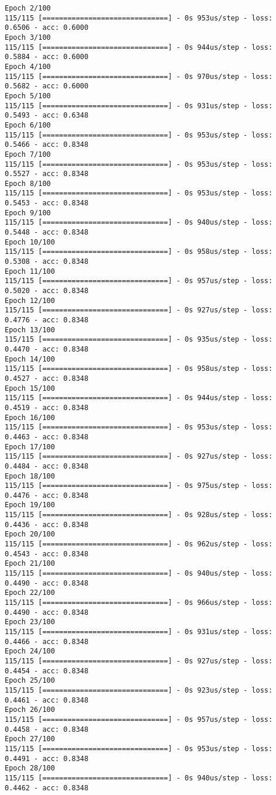 \documentclass[11pt]{article}
\begin{document}
\begin{Verbatim}[commandchars=\\\{\}]
Epoch 2/100
115/115 [==============================] - 0s 953us/step - loss: 0.6506 - acc: 0.6000
Epoch 3/100
115/115 [==============================] - 0s 944us/step - loss: 0.5884 - acc: 0.6000
Epoch 4/100
115/115 [==============================] - 0s 970us/step - loss: 0.5682 - acc: 0.6000
Epoch 5/100
115/115 [==============================] - 0s 931us/step - loss: 0.5493 - acc: 0.6348
Epoch 6/100
115/115 [==============================] - 0s 953us/step - loss: 0.5466 - acc: 0.8348
Epoch 7/100
115/115 [==============================] - 0s 953us/step - loss: 0.5527 - acc: 0.8348
Epoch 8/100
115/115 [==============================] - 0s 953us/step - loss: 0.5453 - acc: 0.8348
Epoch 9/100
115/115 [==============================] - 0s 940us/step - loss: 0.5448 - acc: 0.8348
Epoch 10/100
115/115 [==============================] - 0s 958us/step - loss: 0.5308 - acc: 0.8348
Epoch 11/100
115/115 [==============================] - 0s 957us/step - loss: 0.5020 - acc: 0.8348
Epoch 12/100
115/115 [==============================] - 0s 927us/step - loss: 0.4776 - acc: 0.8348
Epoch 13/100
115/115 [==============================] - 0s 935us/step - loss: 0.4470 - acc: 0.8348
Epoch 14/100
115/115 [==============================] - 0s 958us/step - loss: 0.4527 - acc: 0.8348
Epoch 15/100
115/115 [==============================] - 0s 944us/step - loss: 0.4519 - acc: 0.8348
Epoch 16/100
115/115 [==============================] - 0s 953us/step - loss: 0.4463 - acc: 0.8348
Epoch 17/100
115/115 [==============================] - 0s 927us/step - loss: 0.4484 - acc: 0.8348
Epoch 18/100
115/115 [==============================] - 0s 975us/step - loss: 0.4476 - acc: 0.8348
Epoch 19/100
115/115 [==============================] - 0s 928us/step - loss: 0.4436 - acc: 0.8348
Epoch 20/100
115/115 [==============================] - 0s 962us/step - loss: 0.4543 - acc: 0.8348
Epoch 21/100
115/115 [==============================] - 0s 940us/step - loss: 0.4490 - acc: 0.8348
Epoch 22/100
115/115 [==============================] - 0s 966us/step - loss: 0.4490 - acc: 0.8348
Epoch 23/100
115/115 [==============================] - 0s 931us/step - loss: 0.4466 - acc: 0.8348
Epoch 24/100
115/115 [==============================] - 0s 927us/step - loss: 0.4454 - acc: 0.8348
Epoch 25/100
115/115 [==============================] - 0s 923us/step - loss: 0.4461 - acc: 0.8348
Epoch 26/100
115/115 [==============================] - 0s 957us/step - loss: 0.4458 - acc: 0.8348
Epoch 27/100
115/115 [==============================] - 0s 953us/step - loss: 0.4491 - acc: 0.8348
Epoch 28/100
115/115 [==============================] - 0s 940us/step - loss: 0.4462 - acc: 0.8348

\end{Verbatim}
\end{document}

